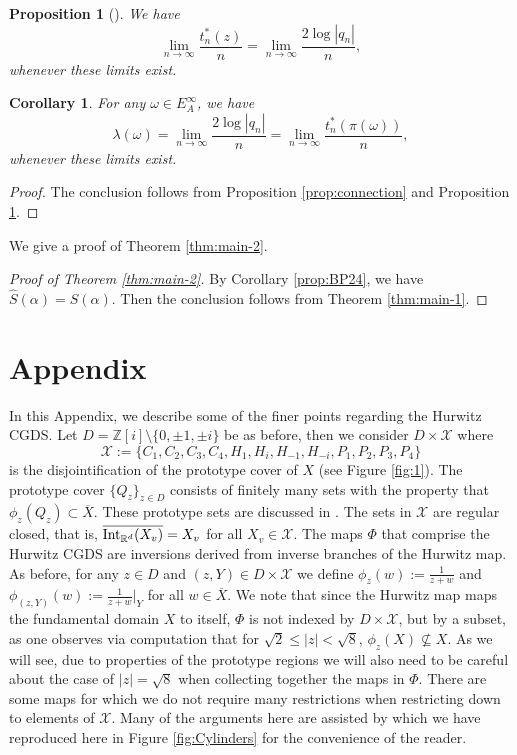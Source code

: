\documentclass[11pt]{amsart}
\theoremstyle{plain}
\newtheorem{corollary}[theorem]{Corollary}
\newtheorem{proposition}[theorem]{Proposition}
\theoremstyle{definition}
\renewcommand\~{\tilde}%
\newcommand{\om}{\ensuremath{\omega}}
\newcommand{\cX}{\ensuremath{\mathcal{X}}}
\numberwithin{equation}{section}
\begin{document}
\begin{proposition}[{\cite[Proof of Proposition 5.1]{baumgartnerP}}]\label{prop:secion7BP}
We have
$$\lim_{n \to \infty}\frac{t_n^*(z)}{n} = \lim_{n \to \infty}\frac{2\log|q_n|}{n},$$ whenever these limits exist.
\end{proposition}

\begin{corollary}
For any $\om \in E_A^{\infty}$, we have
$$
\lambda(\om)=\lim_{n\to\infty}\frac{2\log |q_n|}{n} = \lim_{n \to \infty}\frac{t_n^*(\pi(\om))}{n},
$$
whenever these limits exist.
\end{corollary}\label{prop:BP24}

\begin{proof}
The conclusion follows from Proposition \ref{prop:connection} and Proposition \ref{prop:secion7BP}.
\end{proof}

\medskip

We give a proof of Theorem \ref{thm:main-2}.

\begin{proof}[Proof of Theorem \ref{thm:main-2}]
By Corollary \ref{prop:BP24}, we have $\hat S(\alpha) = S(\alpha)$. Then the conclusion follows from Theorem \ref{thm:main-1}.
\end{proof}


\section{Appendix}
In this Appendix, we describe some of the finer points regarding the Hurwitz CGDS. Let $D = \mathbb{Z}[i]\setminus\{0,\pm1,\pm i\}$ be as before, then we consider $D\times \cX$ where 
$$
    \cX := \{C_1,C_2,C_3,C_4,H_1,H_{i},H_{-1},H_{-i},P_1,P_2,P_3,P_4\}
$$
is the disjointification of the prototype cover of $X$ (see Figure \ref{fig:1}). The prototype cover $\{Q_z\}_{z\in D}$ consists of finitely many sets with the property that $\phi_z(Q_z)\subset \overline{X}$. These prototype sets are discussed in \cite{BGH23}. The sets in $\cX$ are regular closed, that is, $\overline{{\rm Int}_{\mathbb{R}^d} (X_{v})}=X_v$ for all $X_v\in \cX$. The maps $\Phi$ that comprise the Hurwitz CGDS are inversions derived from inverse branches of the Hurwitz map. As before, for any $z\in D$ and $(z,Y)\in D\times \cX$ we define $\phi_z(w) := \frac{1}{z+w}$ and $\phi_{(z,Y)}(w):=\frac{1}{z+w}\vert_Y$ for all $w\in\overline{X}$.
We note that since the Hurwitz map maps the fundamental domain $X$ to itself, $\Phi$ is not indexed by $D\times \cX$, but by a subset, as one observes via computation that for $\sqrt{2}\leq |z|<\sqrt{8}$, $\phi_{z}(X)\not\subseteq X$. As we will see, due to properties of the prototype regions we will also need to be careful about the case of $|z| = \sqrt{8}$ when collecting together the maps in $\Phi$. There are some maps for which we do not require many restrictions when restricting down to elements of $\cX$. Many of the arguments here are assisted by \cite[Figure 2]{BGH23} which we have reproduced here in Figure \ref{fig:Cylinders} for the convenience of the reader.
\end{document}
